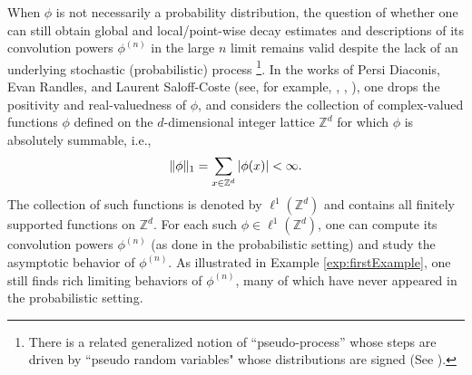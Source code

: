 \documentclass[11pt, letter]{book}
\begin{document}
\noindent When $\phi$ is not necessarily a probability distribution, the question of whether one can still obtain global and local/point-wise decay estimates and descriptions of its convolution powers $\phi^{(n)}$ in the large $n$ limit remains valid despite the lack of an underlying stochastic (probabilistic) process \footnote{There is a related generalized notion of ``pseudo-process'' whose steps are driven by ``pseudo random variables" whose distributions are signed (See \cite{lachal2008first}).}.
In the works of Persi Diaconis, Evan Randles, and Laurent Saloff-Coste (see, for example, \cite{randles_convolution_2015}, \cite{randles_convolution_2017}, \cite{diaconis_convolution_2014}), one drops the positivity and real-valuedness of $\phi$, and considers the collection of complex-valued functions $\phi$ defined on the $d$-dimensional integer lattice $\mathbb{Z}^d$ for which $\phi$ is absolutely summable, i.e.,
\begin{equation*}
    \| \phi \|_1 = \sum_{x\in \mathbb{Z}^d} \abs{\phi(x)} < \infty.
\end{equation*}
The collection of such functions is denoted by $\ell^1(\mathbb{Z}^d)$ and contains all finitely supported functions on $\mathbb{Z}^d$. For each such $\phi\in\ell^1(\mathbb{Z}^d)$, one can compute its convolution powers $\phi^{(n)}$ (as done in the probabilistic setting) and study the asymptotic behavior of $\phi^{(n)}$. As illustrated in Example \ref{exp:firstExample}, one still finds rich limiting behaviors of $\phi^{(n)}$, many of which have never appeared in the probabilistic setting.


\end{document}
